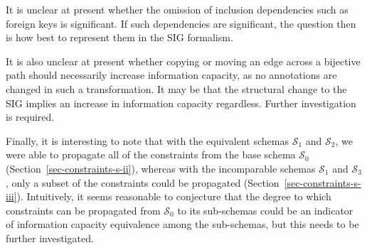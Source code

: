 \documentclass{sig-alternate-05-2015}
\newcounter{constraint}
\newcommand{\SC}[1]{\ensuremath{\mathcal{S}_{#1}}}
\begin{document}
It is unclear at present whether the omission of inclusion dependencies such as foreign keys is significant. If such dependencies are significant, the question then is how best to represent them in the SIG formalism.

It is also unclear at present whether copying or moving an edge across a bijective path should necessarily increase information capacity, as no annotations are changed in such a transformation. It may be that the structural change to the SIG implies an increase in information capacity regardless. Further investigation is required.

Finally, it is interesting to note that with the equivalent schemas \(\SC{1}\) and \(\SC{2}\), we were able to propagate all of the constraints from the base schema \(\SC{0}\) (Section~\ref{sec-constraints-s-ii}), whereas with the incomparable schemas \(\SC{1}\) and \(\SC{3}\), only a subset of the constraints could be propagated (Section~\ref{sec-constraints-s-iii}). Intuitively, it seems reasonable to conjecture that the degree to which constraints can be propagated from \(\SC{0}\) to its sub-schemas could be an indicator of information capacity equivalence among the sub-schemas, but this needs to be further investigated.










\end{document}
